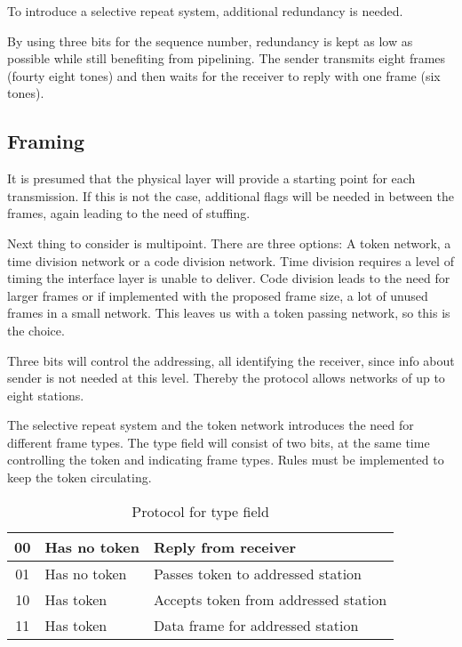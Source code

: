 To introduce a selective repeat system, additional redundancy is needed.

By using three bits for the sequence number, redundancy is kept as low as
possible while still benefiting from pipelining. The sender transmits eight
frames (fourty eight tones) and then waits for the receiver to reply with one
frame (six tones).

\subsection{Framing}
It is presumed that the physical layer will provide a starting point for each
transmission. If this is not the case,
additional flags will be needed in between the frames, again leading to the need
of stuffing.

Next thing to consider is multipoint. There are three options: A token
network, a time division network or a code division network. Time division
requires a level of timing the interface layer is unable to deliver.
Code division leads to the need for larger frames or if implemented with the
proposed frame size, a lot of unused frames in a small network. This leaves us
with a token passing network, so this is the choice.

Three bits will control the addressing, all identifying the receiver, since info
about sender is not needed at this level. Thereby the protocol allows networks
of up to eight stations.

The selective repeat system and the token network introduces the need for different frame types.
The type field will consist of two bits, at the same time controlling
the token and indicating frame types. Rules must be implemented to keep the token circulating.

\begin{table}[htb]
	\begin{center}
	\begin{tabular}{|c|ll|}
		\hline
		00 & Has no token & Reply from receiver \\
		\hline
		01 & Has no token & Passes token to addressed station \\
		\hline
		10 & Has token & Accepts token from addressed station \\
		\hline
		11 & Has token & Data frame for addressed station \\
		\hline
	\end{tabular}
	\end{center}
	\caption{Protocol for type field}
	\label{tab:protocol_for_type_field}
\end{table}


